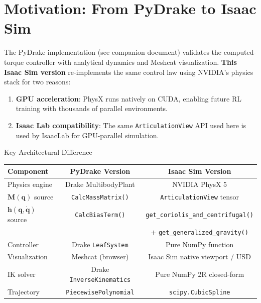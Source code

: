 \documentclass[11pt,a4paper]{article}
\newcommand{\bq}{\bm{q}}
\newcommand{\bdq}{\dot{\bm{q}}}
\newcommand{\bM}{\bm{M}}
\newcommand{\bh}{\bm{h}}
\begin{document}
\newpage

\section{Motivation: From PyDrake to Isaac Sim}
\label{sec:motivation}

The PyDrake implementation (see companion document) validates the computed-torque controller with analytical dynamics and Meshcat visualization. \textbf{This Isaac Sim version} re-implements the same control law using NVIDIA's physics stack for two reasons:

\begin{enumerate}[leftmargin=2em]
    \item \textbf{GPU acceleration}: PhysX runs natively on CUDA, enabling future RL training with thousands of parallel environments.
    \item \textbf{Isaac Lab compatibility}: The same \texttt{ArticulationView} API used here is used by IsaacLab for GPU-parallel simulation.
\end{enumerate}

\begin{archbox}{Key Architectural Difference}
\begin{center}
\begin{tabular}{lcc}
\toprule
\textbf{Component} & \textbf{PyDrake Version} & \textbf{Isaac Sim Version} \\
\midrule
Physics engine & Drake MultibodyPlant & NVIDIA PhysX 5 \\
$\bM(\bq)$ source & \texttt{CalcMassMatrix()} & \texttt{ArticulationView} tensor \\
$\bh(\bq,\bdq)$ source & \texttt{CalcBiasTerm()} & \texttt{get\_coriolis\_and\_centrifugal()} \\
 & & $+$ \texttt{get\_generalized\_gravity()} \\
Controller & Drake \texttt{LeafSystem} & Pure NumPy function \\
Visualization & Meshcat (browser) & Isaac Sim native viewport / USD \\
IK solver & Drake \texttt{InverseKinematics} & Pure NumPy 2R closed-form \\
Trajectory & \texttt{PiecewisePolynomial} & \texttt{scipy.CubicSpline} \\
\bottomrule
\end{tabular}
\end{center}
\end{archbox}
\end{document}
